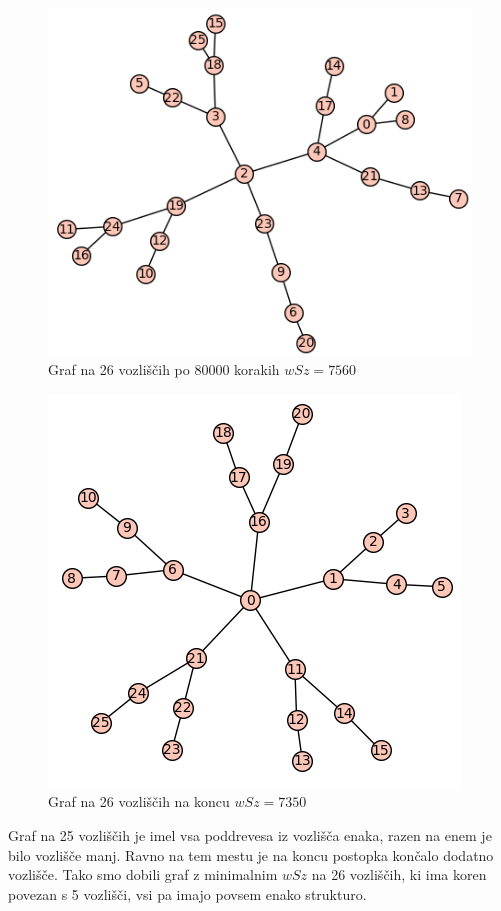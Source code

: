 \documentclass[12pt, a4paper]{article}
\begin{document}
\begin{figure}[h]
\centering
\includegraphics[scale=0.4]{iskanje_graf26_3}
\caption{Graf na 26 vozliščih po 80000 korakih $wSz = 7560$}
\end{figure}

\begin{figure}[h]
\centering
\includegraphics[scale=0.4]{koncni_graf26}
\caption{Graf na 26 vozliščih na koncu $wSz = 7350$}
\end{figure}


Graf na 25 vozliščih je imel vsa poddrevesa iz vozlišča enaka, razen na enem je bilo vozlišče manj. Ravno na tem mestu je na koncu postopka končalo dodatno vozlišče. Tako smo dobili graf z minimalnim $wSz$ na 26 vozliščih, ki ima koren povezan s 5 vozlišči, vsi pa imajo povsem enako strukturo. 
\end{document}
